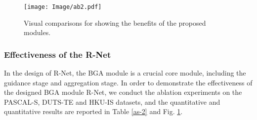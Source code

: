 \documentclass[journal]{IEEEtran}
\begin{document}
\renewcommand\arraystretch{1.4}
\begin{table}[!t]
\centering
\small
 \caption{Ablation study of BGA on the PASCAL-S, HKU-IS and DUTS-TE datasets, where `B' is the baseline model, and `G' denotes the guidance stage, and the `A' represents the aggregation stage.}
 \label{as-2}
\end{table}

\begin{figure}[!t]
	\centering
	\texttt{[image: Image/ab2.pdf]}
	\caption{Visual comparisons for showing the benefits of the proposed modules.}
	\label{visualization-ab2}
\end{figure}
\subsubsection{Effectiveness of the R-Net}
In the design of R-Net, the BGA module is a crucial core module, including the guidance stage and aggregation stage.
In order to demonstrate the effectiveness of the designed BGA module R-Net, we conduct the ablation experiments on the PASCAL-S, DUTS-TE and HKU-IS datasets, and the quantitative and quantitative results are reported in Table \ref{as-2} and Fig. \ref{visualization-ab2}.
\end{document}
